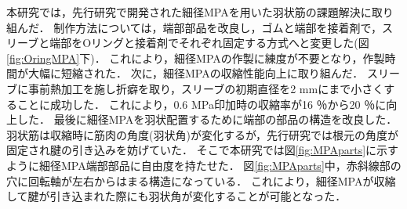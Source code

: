 \documentclass{jarticle}
\begin{document}
本研究では，先行研究\cite{crabrobot2}で開発された細径MPAを用いた羽状筋の課題解決に取り組んだ．
制作方法については，端部部品を改良し，ゴムと端部を接着剤で，スリーブと端部をOリングと接着剤でそれぞれ固定する方式へと変更した(図\ref{fig:OringMPA}下)．
これにより，細径MPAの作製に練度が不要となり，作製時間が大幅に短縮された．
次に，細径MPAの収縮性能向上に取り組んだ．
スリーブに事前熱加工を施し折癖を取り，スリーブの初期直径を2 mmにまで小さくすることに成功した．
これにより，0.6 MPa印加時の収縮率が16 ％から20 ％に向上した．
最後に細径MPAを羽状配置するために端部の部品の構造を改良した．
羽状筋は収縮時に筋肉の角度(羽状角)が変化するが，先行研究\cite{crabrobot2}では根元の角度が固定され腱の引き込みを妨げていた．
そこで本研究では図\ref{fig:MPAparts}に示すように細径MPA端部部品に自由度を持たせた．
図\ref{fig:MPAparts}中，赤斜線部の穴に回転軸が左右からはまる構造になっている．
これにより，細径MPAが収縮して腱が引き込まれた際にも羽状角が変化することが可能となった．
\end{document}
